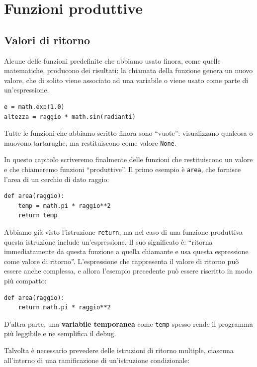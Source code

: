 \documentclass[10pt]{book}
\begin{document}
\chapter{Funzioni produttive}
\label{fruitchap}

\section{Valori di ritorno}

Alcune delle funzioni predefinite che abbiamo usato finora, come quelle matematiche, producono dei risultati: la chiamata della funzione genera un nuovo valore, che di solito viene associato ad una variabile o viene usato come parte di un'espressione.

\begin{verbatim}
e = math.exp(1.0)
altezza = raggio * math.sin(radianti)
\end{verbatim}
%
Tutte le funzioni che abbiamo scritto finora sono ``vuote'': visualizzano qualcosa o muovono tartarughe, ma restituiscono come valore {\tt None}.

In questo capitolo scriveremo finalmente delle funzioni che restituiscono un valore e che chiameremo funzioni ``produttive''.
Il primo esempio è {\tt area}, che fornisce l'area di un cerchio di dato raggio:

\begin{verbatim}
def area(raggio):
    temp = math.pi * raggio**2
    return temp
\end{verbatim}
%
Abbiamo già visto l'istruzione {\tt return}, ma nel caso di una funzione    produttiva questa istruzione include un'espressione. Il suo significato è: ``ritorna immediatamente da questa funzione a quella chiamante e usa questa espressione come valore di ritorno''. L'espressione che rappresenta il valore di ritorno può essere anche complessa, e allora l'esempio precedente può essere riscritto in modo più compatto:

\begin{verbatim}
def area(raggio):
    return math.pi * raggio**2
\end{verbatim}
%
D'altra parte, una {\bf variabile temporanea} come {\tt temp} spesso rende il
programma più leggibile e ne semplifica il debug.

Talvolta è necessario prevedere delle istruzioni di ritorno multiple, ciascuna all'interno di una ramificazione di un'istruzione condizionale:
\end{document}
